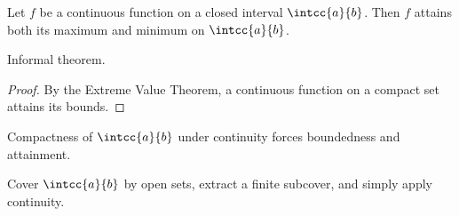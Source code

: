\begin{theorem}
    Let $f$ be a continuous function on a closed interval $\intcc{a}{b}$. Then $f$ attains both its maximum and minimum on $\intcc{a}{b}$.
\end{theorem}
\begin{informaltheorem}
    Informal theorem.
\end{informaltheorem}
\begin{proof}
    By the Extreme Value Theorem, a continuous function on a compact set attains its bounds.
\end{proof}
\begin{proofidea}
    Compactness of $\intcc{a}{b}$ under continuity forces boundedness and attainment.
\end{proofidea}
\begin{proofsketch}
    Cover $\intcc{a}{b}$ by open sets, extract a finite subcover, and simply apply continuity.
\end{proofsketch}

